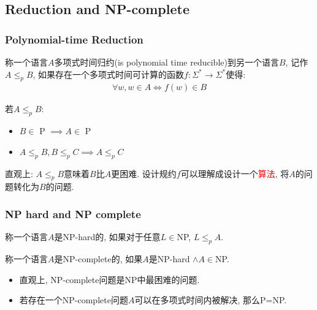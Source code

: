 \subsection{Reduction and NP-complete}
\begin{frame}
    \frametitle{Polynomial-time Reduction}
    \begin{definition}
        称一个语言$A$多项式时间归约(is polynomial time reducible)到另一个语言$B$, 记作$A\leq_p B$, 如果存在一个多项式时间可计算的函数$f:\Sigma^* \rightarrow \Sigma^*$使得:
        \begin{align*}
            \forall w, w\in A \iff f(w) \in B
        \end{align*}
    \end{definition}
    \pause
    若$A\leq_p B$:
    \begin{itemize}
        \item $B \in$ P $\implies A \in$ P
        \item $A \le_p B, B\le_p C \implies A\le_p C$
    \end{itemize}
    直观上: $A\leq_p B$意味着$B$比$A$更困难. 设计规约$f$可以理解成设计一个\textcolor{red}{算法}, 将$A$的问题转化为$B$的问题.
\end{frame}
\begin{frame}
    \frametitle{NP hard and NP complete}
    \begin{definition}[NP-hard]
        称一个语言$A$是NP-hard的, 如果对于任意$L\in$NP, $L\leq_p A$.
    \end{definition}
    \begin{definition}[NP-complete]
        称一个语言$A$是NP-complete的, 如果$A$是NP-hard $\land A\in$NP.
    \end{definition}
    \pause
    \begin{itemize}
        \item 直观上, NP-complete问题是NP中最困难的问题.
        \item 若存在一个NP-complete问题$A$可以在多项式时间内被解决, 那么P=NP.
    \end{itemize}    
\end{frame}